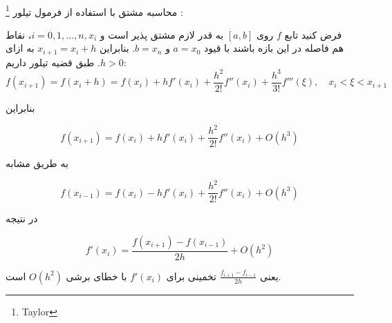 \\
محاسبه مشتق با استفاده از فرمول تیلور
\footnote{Taylor}
:

فرض کنید تابع \( f \) روی \([a, b]\) به قدر لازم مشتق پذیر است و \( i = 0, 1, \ldots, n , x_i \)،  نقاط هم فاصله در این بازه باشند با قیود \( a = x_0 \) و \( b = x_n \). بنابراین \( x_{i+1} = x_i + h \) به ازای \( h>0 \). طبق قضیه تیلور داریم:
\[ f(x_{i + 1}) = f(x_i + h) = f(x_i) + hf'(x_i) + \frac{h^2}{2!}f''(x_i) + \frac{h^3}{3!}f'''(\xi) , \quad x_i < \xi < x_{i+1} \]

بنابراین

\[ f(x_{i + 1}) = f(x_i) + hf'(x_i) + \frac{h^2}{2!}f''(x_i) + O(h^3) \]

به طریق مشابه

\[ f(x_{i-1}) = f(x_i) - hf'(x_i) + \frac{h^2}{2!}f''(x_i) + O(h^3) \]

در نتیجه

\[ f'(x_i) = \frac{f(x_{i+1}) - f(x_{i-1})}{2h} + O(h^2) \]

یعنی \( \frac{f_{i+1} - f_{i-1}}{2h} \) تخمینی برای \( f'(x_i) \) با خطای برشی \( O(h^2) \) است.
